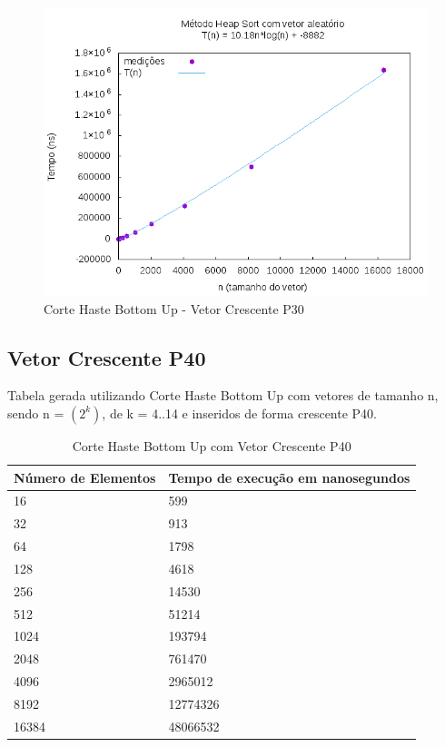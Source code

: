 \documentclass[12pt,a4paper,twoside]{report}
\begin{document}
\begin{figure}[H]
    \centering
    \includegraphics[width=0.7\linewidth]{graficos/HeapSort/vIntAleatorio/vIntAleatorio.png}
  \caption{Corte Haste Bottom Up - Vetor Crescente P30}
\end{figure}




\subsection{Vetor Crescente P40}
Tabela gerada utilizando Corte Haste Bottom Up com vetores de tamanho n, sendo n = $(2^k)$, de k = 4..14 e inseridos de forma crescente P40.
\begin{table}[H]
\centering
\caption{Corte Haste Bottom Up com Vetor Crescente P40}
\label{my-label}
\begin{tabular}{|l|l|}
\hline
\multicolumn{1}{|c|}{\textbf{Número de Elementos}} & \multicolumn{1}{c|}{\textbf{Tempo de execução em nanosegundos}} \\ \hline
16 & 599 \\ \hline
32 & 913 \\ \hline
64 & 1798 \\ \hline
128 & 4618 \\ \hline
256 & 14530 \\ \hline
512 & 51214 \\ \hline
1024 & 193794 \\ \hline
2048 & 761470 \\ \hline
4096 & 2965012 \\ \hline
8192 & 12774326 \\ \hline
16384 & 48066532 \\ \hline
\end{tabular}
\end{table}
\end{document}
